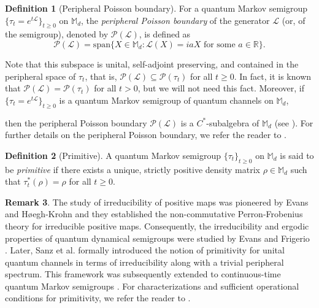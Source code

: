 \documentclass[11pt,reqno]{amsart}
\theoremstyle{definition}
\newtheorem{defn}{Definition}[section]
\newtheorem{rmk}[defn]{Remark}
\theoremstyle{plain}
\theoremstyle{remark}
\numberwithin{equation}{section}%
\begin{document}
  
   \begin{defn}[Peripheral Poisson boundary]
  	For a quantum Markov semigroup $\{\tau_t = e^{t\mathcal{L}}\}_{t \ge 0}$ on $\mathbb{M}_d$, the \textit{peripheral Poisson boundary} of the generator $\mathcal{L}$ (or, of the semigroup), denoted by $\mathcal{P}(\mathcal{L})$, is defined as
  	\[
  	\mathcal{P}(\mathcal{L}) = \text{span}\{X \in \mathbb{M}_d : \mathcal{L}(X) = iaX \text{ for some } a \in \mathbb{R}\}.
  	\]
  \end{defn}
  
  Note that this subspace is unital, self-adjoint preserving, and contained in the peripheral space of $\tau_t$, that is, $\mathcal{P}(\mathcal{L})\subseteq\mathcal{P}(\tau_t)$ for all $t\geq 0$. In fact, it is known that $\mathcal{P}(\mathcal{L})=\mathcal{P}(\tau _t)$ for all $t>0$, but we will not need this fact. Moreover, if $\{\tau_t = e^{t\mathcal{L}}\}_{t \ge 0}$ is a quantum Markov semigroup of quantum channels on $\mathbb{M}_d$,
  
  then the peripheral Poisson boundary $\mathcal{P}(\mathcal{L})$ is a $C^*$-subalgebra of $\mathbb{M}_d$ (see  \cite[Lemma 4.5]{BD}). For further details on the peripheral Poisson boundary, we refer the reader to \cite{BA}. 
  
  
  \begin{defn}[Primitive]
  	A quantum Markov semigroup $\{\tau_t\}_{t \ge 0}$ on $\mathbb{M}_d$ is said to be \textit{primitive} if there exists a unique, strictly positive density matrix $\rho \in \mathbb{M}_d$ such that $\tau_t^*(\rho) = \rho$ for all $t \ge 0$.
  \end{defn}
  
  
   \begin{rmk}
  	The study of irreducibility of positive maps was pioneered by Evans and H{\o}egh-Krohn \cite{EvaDE:HoeR78} and they established the non-commutative Perron-Frobenius theory for irreducible positive maps. Consequently, the irreducibility and ergodic properties of quantum dynamical semigroups were studied by Evans \cite{EvaDE77} and Frigerio \cite{FriA77}. Later, Sanz et al. \cite{SPWC} formally introduced the notion of primitivity for unital quantum channels in terms of irreducibility along with a trivial peripheral spectrum. This framework was subsequently extended to continuous-time quantum Markov semigroups \cite{BCGPY,RD}. For characterizations and sufficient operational conditions for primitivity, we refer the reader to \cite{BCGPY,Wo}. 
  \end{rmk}
  
\end{document}

